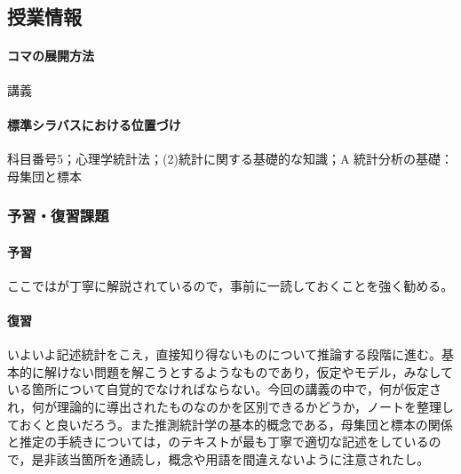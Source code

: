 \subsection{授業情報}
\paragraph{コマの展開方法}
講義
\paragraph{標準シラバスにおける位置づけ}
科目番号5；心理学統計法；(2)統計に関する基礎的な知識；A 統計分析の基礎：母集団と標本
\subsubsection{予習・復習課題}
\paragraph{予習}
ここでは\citet{Yamada2004}が丁寧に解説されているので，事前に一読しておくことを強く勧める。
\paragraph{復習}
いよいよ記述統計をこえ，直接知り得ないものについて推論する段階に進む。基本的に解けない問題を解こうとするようなものであり，仮定やモデル，みなしている箇所について自覚的でなければならない。今回の講義の中で，何が仮定され，何が理論的に導出されたものなのかを区別できるかどうか，ノートを整理しておくと良いだろう。また推測統計学の基本的概念である，母集団と標本の関係と推定の手続きについては，\citet{Yamada2004}のテキストが最も丁寧で適切な記述をしているので，是非該当箇所を通読し，概念や用語を間違えないように注意されたし。
